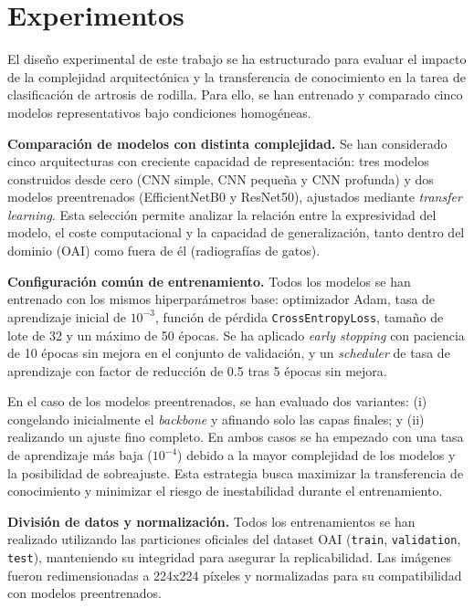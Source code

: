 
\section{Experimentos}

El diseño experimental de este trabajo se ha estructurado para evaluar el impacto de la complejidad arquitectónica y la transferencia de conocimiento 
en la tarea de clasificación de artrosis de rodilla. Para ello, se han entrenado y comparado cinco modelos representativos bajo condiciones homogéneas.

\textbf{Comparación de modelos con distinta complejidad.}
Se han considerado cinco arquitecturas con creciente capacidad de representación: tres modelos construidos desde cero (CNN simple, CNN pequeña y CNN profunda) 
y dos modelos preentrenados (EfficientNetB0 y ResNet50), ajustados mediante \textit{transfer learning}. Esta selección permite analizar la relación entre la 
expresividad del modelo, el coste computacional y la capacidad de generalización, tanto dentro del dominio (OAI) como fuera de él (radiografías de gatos).

\textbf{Configuración común de entrenamiento.}
Todos los modelos se han entrenado con los mismos hiperparámetros base: optimizador Adam, tasa de aprendizaje inicial de $10^{-3}$, función de pérdida
\texttt{CrossEntropyLoss}, tamaño de lote de 32 y un máximo de 50 épocas. Se ha aplicado \textit{early stopping} con paciencia de 10 épocas sin mejora 
en el conjunto de validación, y un \textit{scheduler} de tasa de aprendizaje con factor de reducción de 0.5 tras 5 épocas sin mejora.

En el caso de los modelos preentrenados, se han evaluado dos variantes: (i) congelando inicialmente el \textit{backbone} y afinando solo las capas finales; 
y (ii) realizando un ajuste fino completo. En ambos casos se ha empezado con una tasa de aprendizaje más baja ($10^{-4}$) debido a la mayor complejidad de
los modelos y la posibilidad de sobreajuste. Esta estrategia busca maximizar la transferencia de conocimiento y minimizar el riesgo de inestabilidad durante el
entrenamiento.

\textbf{División de datos y normalización.}
Todos los entrenamientos se han realizado utilizando las particiones oficiales del dataset OAI (\texttt{train}, \texttt{validation}, \texttt{test}), 
manteniendo su integridad para asegurar la replicabilidad. Las imágenes fueron redimensionadas a 224x224 píxeles y normalizadas para su compatibilidad 
con modelos preentrenados.


